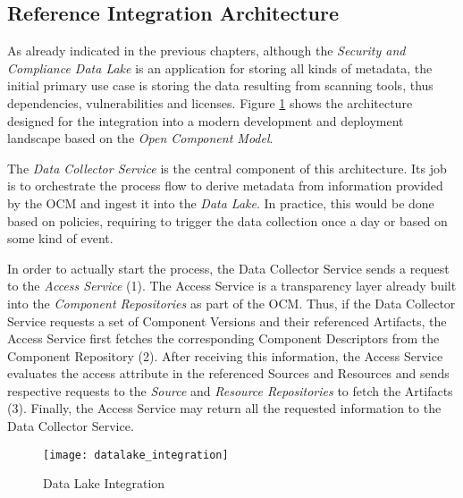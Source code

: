 \subsection{Reference Integration Architecture} \label{sec:Reference Integration Architecture}
As already indicated in the previous chapters, although the \emph{Security and Compliance Data Lake} is an application for storing all kinds of metadata, the initial primary use case is storing the data resulting from scanning tools, thus dependencies, vulnerabilities and licenses. Figure \ref{fig:DataLakeIntegration} shows the architecture designed for the integration into a modern development and deployment landscape based on the \emph{Open Component Model}.\par
The \emph{Data Collector Service} is the central component of this architecture. Its job is to orchestrate the process flow to derive metadata from information provided by the OCM and ingest it into the \emph{Data Lake}. In practice, this would be done based on policies, requiring to trigger the data collection once a day or based on some kind of event.\par 
In order to actually start the process, the Data Collector Service sends a request to the \emph{Access Service} (1). The Access Service is a transparency layer already built into the \emph{Component Repositories} as part of the OCM. Thus, if the Data Collector Service requests a set of Component Versions and their referenced Artifacts, the Access Service first fetches the corresponding Component Descriptors from the Component Repository (2). After receiving this information, the Access Service evaluates the access attribute in the referenced Sources and Resources and sends respective requests to the \emph{Source} and \emph{Resource Repositories} to fetch the Artifacts (3). Finally, the Access Service may return all the requested information to the Data Collector Service.\par

\begin{figure}[H]
	\centering
	\texttt{[image: datalake\_integration]}
	\caption[Data Lake Integration]{Data Lake Integration }
	\label{fig:DataLakeIntegration}
\end{figure}

